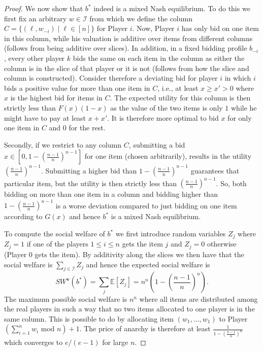 \begin{proof}
  We now show that $ b^{*} $ indeed is a mixed Nash equilibrium. To do this we first fix an arbitrary $ w \in \mathcal{I} $ from which we define the column $ C = \{(\ell, w_{-i}) \mid \ell \in [n]\} $ for Player $ i $. Now, Player $ i $ has only bid on one item in this column, while his valuation is additive over items from different columns (follows from being additive over slices). In addition, in a fixed bidding profile $ b_{-i} $, every other player $ k $ bids the same on each item in the column as either the column is in the slice of that player or it is not (follows from how the slice and column is constructed). Consider therefore a deviating bid for player $ i $ in which $ i $ bids a positive value for more than one item in $ C $, i.e., at least $ x \geq x' >0 $ where $ x $ is the highest bid for items in $ C $. The expected utility for this column is then strictly less than $ F(x)(1 - x) $ as the value of the two items is only $ 1 $ while he might have to pay at least $ x + x' $. It is therefore more optimal to bid $ x $ for only one item in $ C $ and 0 for the rest.


  Secondly, if we restrict to any column $ C $, submitting a bid $ x \in \left[ 0, 1 - \left( \frac{n -1}{n} \right)^{n-1}  \right] $ for one item (chosen arbitrarily), results in the utility $ \left( \frac{n - 1}{n} \right)^{n-1} $. Submitting a higher bid than $ 1 - \left( \frac{n-1}{n} \right)^{n-1} $ guarantees that particular item, but the utility is then strictly less than $ \left( \frac{n-1}{n} \right)^{n-1} $. So, both bidding on more than one item in a column and bidding higher than $ 1 - \left( \frac{n - 1}{n} \right)^{n-1} $ is a worse deviation compared to just bidding on one item according to $ G(x) $ and hence $ b^{*} $ is a mixed Nash equilibrium.


  To compute the social welfare of $ b^{*} $ we first introduce random variables $ Z_j $ where $ Z_j = 1 $ if one of the players $ 1\leq i \leq n $ gets the item $ j $ and $ Z_j = 0 $ otherwise (Player 0 gets the item). By additivity along the slices we then have that the social welfare is $ \sum_{j \in \mathcal{I}}Z_j $ and hence the expected social welfare is
  \begin{equation}
    SW^{\mathbf{v}}(b^{*}) = \sum_{j}\mathbb{E}\left[ Z_j \right]= n^{n}\left( 1 - \left( \frac{n-1}{n} \right)^{n} \right).
  \end{equation}
  The maximum possible social welfare is $ n^{n} $ where all items are distributed among the real players in such a way that no two items allocated to one player is in the same column. This is possible to do by allocating item $ (w_1, \ldots, w_1) $ to Player $ \left( \sum_{i = 1}^{n} w_i \text{ mod } n \right) + 1 $. The price of anarchy is therefore at least $ \frac{1}{1 - \left( \frac{n - 1}{n} \right)^{n}} $ which converges to $ e /(e - 1) $ for large $ n $.
\end{proof}

